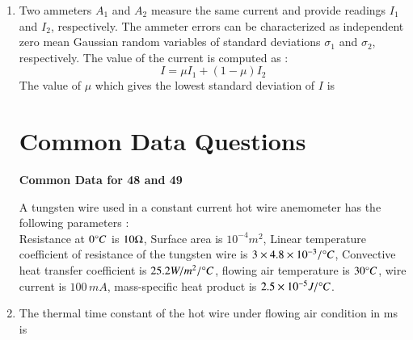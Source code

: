 \documentclass[journal,12pt,onecolumn]{IEEEtran}
\theoremstyle{remark}
\begin{document}
\begin{enumerate}
\item Two ammeters $A_1$ and $A_2$ measure the same current and provide readings $I_1$ and $I_2$, respectively. The ammeter errors can be characterized as independent zero mean Gaussian random variables of standard deviations $\sigma_1$ and $\sigma_2$, respectively. The value of the current is computed as :  
$$
I = \mu I_1 + (1 - \mu) I_2
$$
The value of $\mu$ which gives the lowest standard deviation of $I$ is  
\par \hfill{}
\begin{enumerate}
\end{enumerate}

\section*{Common Data Questions}

\textbf{Common Data for 48 and 49}

A tungsten wire used in a constant current hot wire anemometer has the following parameters : \\
Resistance at $0 \degree C$ is $10 \ohm$, Surface area is $10^{-4} m^2$, Linear temperature coefficient of resistance of the tungsten wire is $3 \times 4.8 \times 10^{-3} / \degree C$, Convective heat transfer coefficient is $25.2 W/m^2 / \degree C$, flowing air temperature is $30 \degree C$, wire current is $100\,mA$, mass-specific heat product is $2.5 \times 10^{-5} J / \degree C$.

\item The thermal time constant of the hot wire under flowing air condition in ms is  
\par \hfill{}
\begin{enumerate}
\end{enumerate}


\end{enumerate}
\end{document}
